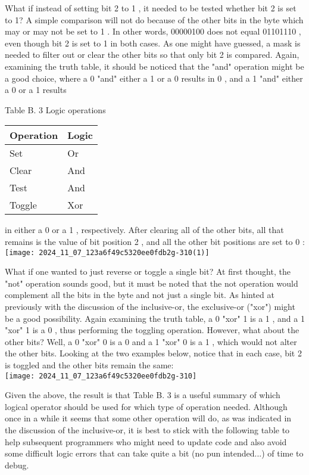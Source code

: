 \documentclass[10pt]{article}
\begin{document}
What if instead of setting bit 2 to 1 , it needed to be tested whether bit 2 is set to 1? A simple comparison will not do because of the other bits in the byte which may or may not be set to 1 . In other words, 00000100 does not equal 01101110 , even though bit 2 is set to 1 in both cases. As one might have guessed, a mask is needed to filter out or clear the other bits so that only bit 2 is compared. Again, examining the truth table, it should be noticed that the "and" operation might be a good choice, where a 0 "and" either a 1 or a 0 results in 0 , and a 1 "and" either a 0 or a 1 results

Table B. 3 Logic operations

\begin{center}
\begin{tabular}{|l|l|}
\hline
Operation & Logic \\
\hline
Set & Or \\
\hline
Clear & And \\
\hline
Test & And \\
\hline
Toggle & Xor \\
\hline
\end{tabular}
\end{center}

in either a 0 or a 1 , respectively. After clearing all of the other bits, all that remains is the value of bit position 2 , and all the other bit positions are set to 0 :\\
\texttt{[image: 2024\_11\_07\_123a6f49c5320ee0fdb2g-310(1)]}

What if one wanted to just reverse or toggle a single bit? At first thought, the "not" operation sounds good, but it must be noted that the not operation would complement all the bits in the byte and not just a single bit. As hinted at previously with the discussion of the inclusive-or, the exclusive-or ("xor") might be a good possibility. Again examining the truth table, a 0 "xor" 1 is a 1 , and a 1 "xor" 1 is a 0 , thus performing the toggling operation. However, what about the other bits? Well, a 0 "xor" 0 is a 0 and a 1 "xor" 0 is a 1 , which would not alter the other bits. Looking at the two examples below, notice that in each case, bit 2 is toggled and the other bits remain the same:\\
\texttt{[image: 2024\_11\_07\_123a6f49c5320ee0fdb2g-310]}

Given the above, the result is that Table B. 3 is a useful summary of which logical operator should be used for which type of operation needed. Although once in a while it seems that some other operation will do, as was indicated in the discussion of the inclusive-or, it is best to stick with the following table to help subsequent programmers who might need to update code and also avoid some difficult logic errors that can take quite a bit (no pun intended...) of time to debug.
\end{document}
